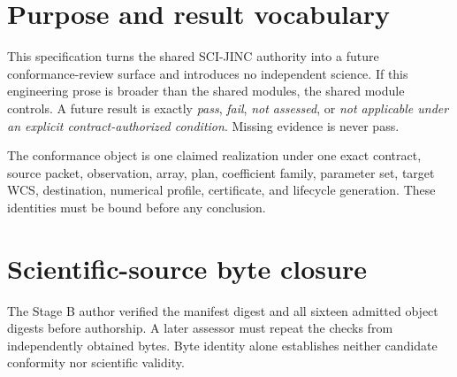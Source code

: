 \documentclass[10pt]{article}
\begin{document}
\tableofcontents
\clearpage

\section{Purpose and result vocabulary}
\label{sec:eng-purpose}

This specification turns the shared SCI-JINC authority into a future
conformance-review surface and introduces no independent science.  If this
engineering prose is broader than the shared modules, the shared module
controls.  A future result is exactly \emph{pass}, \emph{fail}, \emph{not
assessed}, or \emph{not applicable under an explicit contract-authorized
condition}.  Missing evidence is never pass.

The conformance object is one claimed realization under one exact contract,
source packet, observation, array, plan, coefficient family, parameter set,
target WCS, destination, numerical profile, certificate, and lifecycle
generation.  These identities must be bound before any conclusion.

\section{Scientific-source byte closure}
\label{sec:eng-source-closure}

The Stage B author verified the manifest digest and all sixteen admitted
object digests before authorship.  A later assessor must repeat the checks
from independently obtained bytes.  Byte identity alone establishes neither
candidate conformity nor scientific validity.
\end{document}
